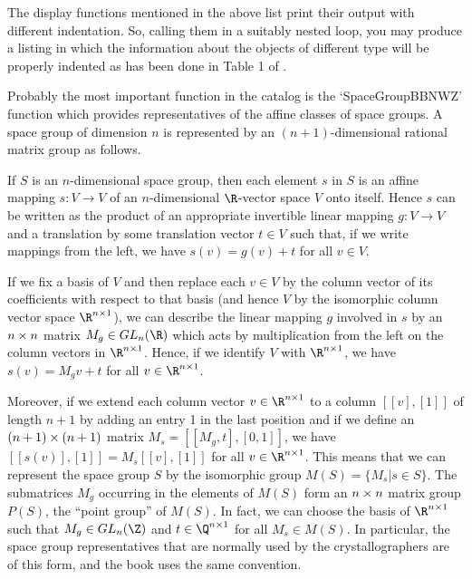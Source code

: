 The display functions mentioned in the above list print their output
with different indentation.  So, calling them in a suitably nested
loop, you may produce a listing in which the information about the
objects of different type will be properly indented as has been done
in Table 1 of \cite{BBNWZ78}.


Probably the most important function in the catalog is the
`SpaceGroupBBNWZ' function which provides representatives of the
affine classes of space groups.  A space group of dimension $n$ is
represented by an $(n+1)$-dimensional rational matrix group as
follows.

If $S$ is an $n$-dimensional space group, then each element $s$
in $S$ is an affine mapping $s: V \to V$ of an $n$-dimensional 
$\R$-vector space $V$ onto itself.  Hence $s$ can be written as 
the product of an appropriate invertible linear mapping
$g: V \to V$ and a translation by some translation
vector $t \in V$ such that, if we write mappings from the left, 
we have $s(v) = g(v) + t$ for all $v \in V$.

If we fix a basis of $V$ and then replace each $v \in V$ by the column
vector of its coefficients with respect to that basis (and hence $V$
by the isomorphic column vector space $\R^{n \x 1}$), we can describe
the linear mapping $g$ involved in $s$ by an $n \times n$ matrix
$M_g \in GL_n(\R)$ which acts by multiplication from the left on
the column vectors in $\R^{n \x 1}$.  Hence, if we identify $V$ with
$\R^{n \x 1}$, we have $s(v) = M_g v + t$ for all 
$v \in \R^{n \x 1}$.

Moreover, if we extend each column vector $v \in \R^{n \x 1}$ to a
column $[ [ v ], [ 1 ] ]$ of length $n+1$ by adding an entry 1 
in the last position and if we define an $(n+1) \times (n+1)$ matrix 
$M_s = [ [ M_g, t ], [ 0, 1 ] ]$, we have $[ [ s(v) ], [ 1 ] ] = 
M_s [ [ v ], [ 1 ] ]$ for all $v \in \R^{n \x 1}$. This means that 
we can represent the space group $S$ by the isomorphic group 
$M(S) = \{ M_s | s \in S \}$.  The submatrices $M_g$ occurring in 
the elements of $M(S)$ form an $n \times n$ matrix group $P(S)$, the 
``point group'' of $M(S)$.  In fact, we can choose the basis of 
$\R^{n \x 1}$ such that $M_g \in GL_n(\Z)$ and  $t \in \Q^{n \x 1}$ 
for all $M_s \in M(S)$.  In particular, the space group 
representatives that are normally used by the crystallographers
are of this form, and the book \cite{BBNWZ78} uses the same convention.

